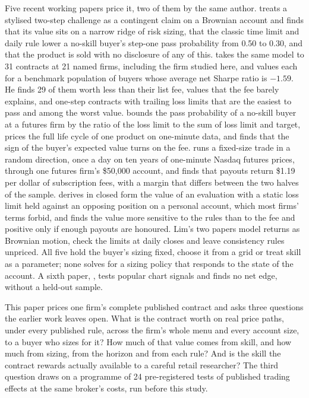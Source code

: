 \documentclass[11pt]{article}
\begin{document}
Five recent working papers price it, two of them by the same author. \citet{lim2026} treats a stylised two-step
challenge as a contingent claim on a Brownian account and finds that its value sits on a narrow ridge of risk
sizing, that the classic time limit and daily rule lower a no-skill buyer's step-one pass probability from 0.50 to
0.30, and that the product is sold with no disclosure of any of this. \citet{lim2026b} takes the same model to 31
contracts at 21 named firms, including the firm studied here, and values each for a benchmark population of buyers
whose average net Sharpe ratio is $-1.59$. He finds 29 of them worth less than their list fee, values that the fee
barely explains, and one-step contracts with trailing loss limits that are the easiest to pass and among the worst
value. \citet{villahermosa2026} bounds the pass probability of a no-skill buyer at a futures firm by the ratio of
the loss limit to the sum of loss limit and target, prices the full life cycle of one product on one-minute data,
and finds that the sign of the buyer's expected value turns on the fee. \citet{youngblood2026} runs a fixed-size trade
in a random direction, once a day on ten years of one-minute Nasdaq futures prices, through one futures firm's
\$50,000 account, and finds that payouts return \$1.19 per dollar of subscription fees, with a margin that
differs between the two halves of the sample. \citet{ruether2026} derives in closed form the value of an
evaluation with a static loss limit held against an opposing position on a personal account, which most firms'
terms forbid, and finds the value more sensitive to the rules than to the fee and positive only if enough payouts
are honoured. Lim's two papers model returns as Brownian motion, check the limits at daily closes and leave
consistency rules unpriced. All five hold the buyer's sizing fixed, choose it from a grid or treat skill as a
parameter; none solves for a sizing policy that responds to the state of the account. A sixth paper,
\citet{darmanin2026}, tests popular chart signals and finds no net edge, without a held-out sample.

This paper prices one firm's complete published contract and asks three questions the earlier work leaves open.
What is the contract worth on real price paths, under every published rule, across the firm's whole menu and every
account size, to a buyer who sizes for it? How much of that value
comes from skill, and how much from sizing, from the horizon and from each rule? And is the skill the contract
rewards actually available to a careful retail researcher? The third question draws on a programme of 24
pre-registered tests of published trading effects at the same broker's costs, run before this study.
\end{document}
